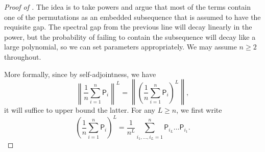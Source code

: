 \documentclass[10pt,a4paper]{amsart}
\begin{document}
\begin{proof}[Proof of ]
    The idea is to take powers and argue that most of the terms contain one of the permutations as an embedded subsequence that is assumed to have the requisite gap. The spectral gap from the previous line will decay linearly in the power, but the probability of failing to contain the subsequence will decay like a large polynomial, so we can set parameters appropriately. We may assume $n\geq 2$ throughout.

    More formally, since by self-adjointness, we have
    \begin{equation*}
        \left\|\frac{1}{n}\sum_{i=1}^n \mathsf{P}_i\right\|^L =\left\|\left(\frac{1}{n}\sum_{i=1}^n \mathsf{P}_i\right)^L\right\| ,
    \end{equation*}
    it will suffice to upper bound the latter. For any $L\geq n$, we first write
    \begin{equation*}
        \left(\frac{1}{n}\sum_{i=1}^n \mathsf{P}_i \right)^L = \frac{1}{n^L}\sum_{i_1,\ldots,i_L=1}^n \mathsf{P}_{i_L}\ldots \mathsf{P}_{i_1}.
    \end{equation*}


\end{proof}
\end{document}
